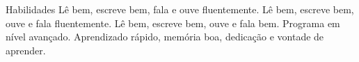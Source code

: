 
\begin{rubric}{Habilidades}
\entry*[Inglês]
	Lê bem, escreve bem, fala e ouve fluentemente.
\entry*[Japonês]
	Lê bem, escreve bem, ouve e fala fluentemente.
\entry*[Latim]
        Lê bem, escreve bem, ouve e fala bem.
	Programa em nível avançado.
	Aprendizado rápido, memória boa, dedicação e vontade de aprender.
\end{rubric}
